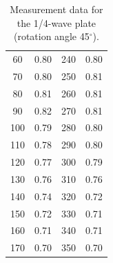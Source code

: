 \documentclass[a4paper]{article}
\begin{document}
\begin{table}[H]
\begin{tabular}{cc||cc}
		60                                                 & 0.80                                            & 240                                & 0.80                                            \\
		70                                                 & 0.80                                            & 250                                & 0.81                                            \\
		80                                                 & 0.81                                            & 260                                & 0.81                                            \\
		90                                                 & 0.82                                            & 270                                & 0.81                                            \\
		100                                                & 0.79                                            & 280                                & 0.80                                            \\
		110                                                & 0.78                                            & 290                                & 0.80                                            \\
		120                                                & 0.77                                            & 300                                & 0.79                                            \\
		130                                                & 0.76                                            & 310                                & 0.76                                            \\
		140                                                & 0.74                                            & 320                                & 0.72                                            \\
		150                                                & 0.72                                            & 330                                & 0.71                                            \\
		160                                                & 0.71                                            & 340                                & 0.71                                            \\
		170                                                & 0.70                                            & 350                                & 0.70                                            \\
		\hline
	\end{tabular}
	\caption{Measurement data for the 1/4-wave plate (rotation angle 45$^\circ$).}
	\label{table::1/4,45}
\end{table}
\end{document}
